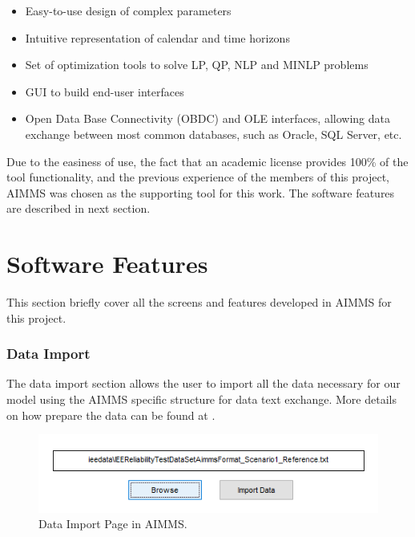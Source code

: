 \documentclass[12pt,LUDisStyle,twosided]{book}
\begin{document}
\begin{itemize}
\item Easy-to-use design of complex parameters
\item Intuitive representation of calendar and time horizons
\item Set of optimization tools to solve LP, QP, NLP and MINLP problems
\item GUI to build end-user interfaces
\item Open Data Base Connectivity (OBDC) and OLE interfaces, allowing data exchange between most common databases, such as Oracle, SQL Server, etc.
\end{itemize}

Due to the easiness of use, the fact that an academic license provides 100\% of the tool functionality, and the previous experience of the members of this project, AIMMS was chosen as the supporting tool for this work. The software features are described in next section.

\section{Software Features}

This section briefly cover all the screens and features developed in AIMMS for this project.

\subsubsection{Data Import}

The data import section allows the user to import all the data necessary for our model using the AIMMS specific structure for data text exchange. More details on how prepare the data can be found at \cite{bisschop}.

\begin{figure}[H] 
	\begin{center}
		\includegraphics[keepaspectratio]{aimmsScreenImportPage.png}
	  	\caption{Data Import Page in AIMMS.}
     	\label{fig:aimmsScreenImportPage}
	\end{center}
\end{figure}
\end{document}
